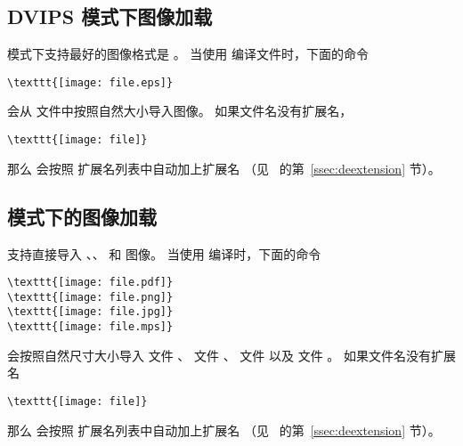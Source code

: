 \subsection{DVIPS 模式下图像加载}
 模式下支持最好的图像格式是 。
当使用  编译文件时，下面的命令
\begin{lstlisting}
\texttt{[image: file.eps]}
\end{lstlisting}
会从  文件中按照自然大小导入图像。
如果文件名没有扩展名，
\begin{lstlisting}
\texttt{[image: file]}
\end{lstlisting}
那么  会按照  扩展名列表中自动加上扩展名
（见~\pageref{ssec:deextension} 的第~\ref{ssec:deextension} 节）。

\subsection[pdfLaTeX 模式下的图像加载]{\pdfLaTeX{} 模式下的图像加载}
\pdfTeX{} 支持直接导入 、、 和 \MetaPost{} 图像。
当使用  编译时，下面的命令
\begin{lstlisting}
\texttt{[image: file.pdf]}
\texttt{[image: file.png]}
\texttt{[image: file.jpg]}
\texttt{[image: file.mps]}
\end{lstlisting}
会按照自然尺寸大小导入  文件 、
 文件 、
 文件 
以及 \MetaPost{} 文件 。
如果文件名没有扩展名
\begin{lstlisting}
\texttt{[image: file]}
\end{lstlisting}
那么  会按照  扩展名列表中自动加上扩展名
（见~\pageref{ssec:deextension} 的第~\ref{ssec:deextension} 节）。

